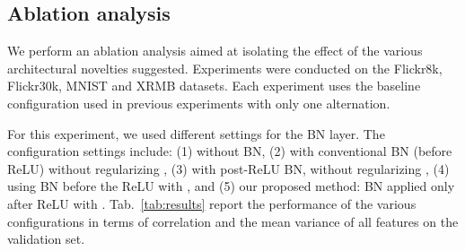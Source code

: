 \documentclass[10pt,twocolumn,letterpaper]{article}
\begin{document}
\begin{table*}[t]
\begin{tabular}{|l|c|c|c|c|c|c|c|c|c|c|c|c|}
\hline
\end{tabular}
\caption{The recall rates for the Flickr8k, Flickr30k and COCO image to sentence matching benchmarks. In image search, we show the percent of correct matches for the top retrieval out of all test images (r@1 for search). In image annotation, given a query image, fetching one of five matching sentences is considered a success. Recall rates for the top five (r@5) denote the cases in which a successful match exists in any of the top five results. The experiments reported for regularized CCA, RCCA, and our 2-way net all use the same sentence and image representation. Sentences are represented as the concatenation of the GMM-FV and the HGLMM-FV representations of~\cite{Klein_2015_CVPR}. 
\label{tab:flickrs}. Image is represented with the last dense connected of the CNN used in ~\cite{Klein_2015_CVPR}. }
\label{tab:flickrs}
\end{table*}

\subsection{Ablation analysis}
We perform an ablation analysis aimed at isolating the effect of the various architectural novelties suggested. Experiments were conducted on the Flickr8k, Flickr30k, MNIST and XRMB datasets. Each experiment uses the baseline configuration used in previous experiments with only one alternation.

For this experiment, we used different settings for the BN layer. The configuration settings include: (1) without BN, (2) with conventional BN (before ReLU) without regularizing , (3) with post-ReLU BN, without regularizing , (4) using BN before the ReLU with , and (5) our proposed method: BN applied only after ReLU with .  Tab.~\ref{tab:results} report the performance of the various configurations in terms of correlation and the mean variance of all features on the validation set.
\end{document}
